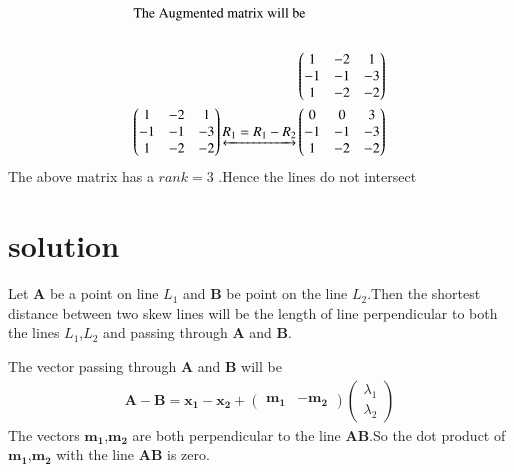 \documentclass[journal,12pt,twocolumn]{IEEEtran}
\begin{document}
\begin{align}
    \intertext{The Augmented matrix will be}\\
    \begin{pmatrix}1 & -2 & 1\\-1 & -1 & -3\\1 & -2 & -2\end{pmatrix}\\
    \begin{pmatrix}1 & -2 & 1\\-1 & -1 & -3\\1 & -2 & -2\end{pmatrix}\underleftrightarrow{R_1=R_1-R_2}\begin{pmatrix}0 & 0 & 3\\-1 & -1 & -3\\1 & -2 & -2\end{pmatrix}
\end{align}
The above matrix has a $rank=3$ .Hence the lines do not intersect
\section{solution}
Let $\bm{A}$ be a point on line $L_1$ and $\bm{B}$ be point on the line $L_2$.Then the shortest distance between two skew lines will be the length of line perpendicular to both the lines $L_1$,$L_2$ and passing through $\bm{A}$ and $\bm{B}$.\par
\vspace{5mm}
The vector passing through $\bm{A}$ and $\bm{B}$ will be \\
\begin{align}
    \bm{A-B}=\bm{x_1-x_2}+\begin{pmatrix}\bm{m_1} & -\bm{m_2}\end{pmatrix}\begin{pmatrix}\lambda_1\\\lambda_2\end{pmatrix}
\end{align}
The vectors $\bm{m_1}$,$\bm{m_2}$ are both perpendicular to the line $\bm{AB}$.So the dot product of $\bm{m_1}$,$\bm{m_2}$ with the line $\bm{AB}$ is zero.\\
\end{document}
